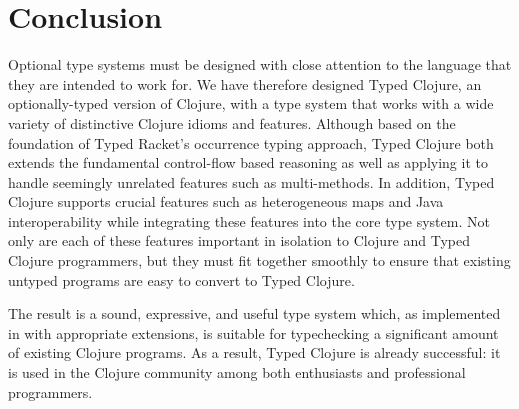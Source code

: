 \section{Conclusion}
\label{sec:conclusion}

Optional type systems must be designed with close attention to the
language that they are intended to work for.
We have therefore designed Typed Clojure, an optionally-typed version of
Clojure, with a type system that works with a wide variety of distinctive
Clojure idioms and features. Although based on the foundation of Typed
Racket's occurrence typing approach, Typed Clojure both extends the
fundamental control-flow based reasoning as well as applying it to
handle seemingly unrelated features such as multi-methods. In
addition, Typed Clojure supports crucial features such as
heterogeneous maps and Java interoperability while integrating these
features into the core type system. Not only are each of these
features important in isolation to Clojure and Typed Clojure
programmers, but they must fit together smoothly to ensure that
existing untyped programs are easy to convert to Typed Clojure.

The result is a sound, expressive, and useful type system which, as
implemented in \coretyped with appropriate extensions, is suitable for
typechecking a significant amount of existing Clojure programs.
%
As a result, Typed Clojure is already successful: it is used in
the Clojure community among both enthusiasts and professional
programmers.%




%

